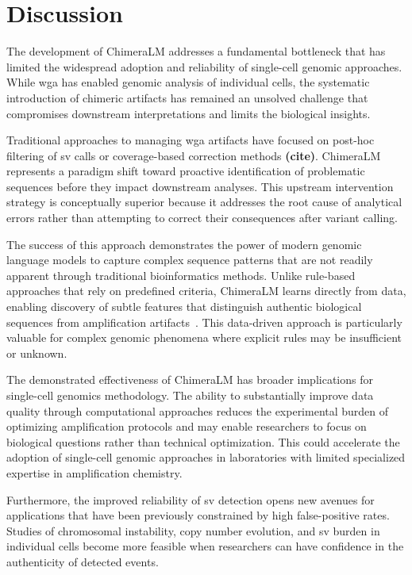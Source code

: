 \documentclass[pdflatex,sn-nature]{sn-jnl}%
\theoremstyle{thmstyleone}%
\theoremstyle{thmstyletwo}%
\theoremstyle{thmstylethree}%
\begin{document}
\section*{Discussion}

The development of ChimeraLM addresses a fundamental bottleneck that has limited the widespread adoption and reliability of single-cell genomic approaches.
While \gls{wga} has enabled genomic analysis of individual cells, the systematic introduction of chimeric artifacts has remained an unsolved challenge that compromises downstream interpretations and limits the biological insights.

Traditional approaches to managing \gls{wga} artifacts have focused on post-hoc filtering of \gls{sv} calls or coverage-based correction methods \textbf{(cite)}.
ChimeraLM represents a paradigm shift toward proactive identification of problematic sequences before they impact downstream analyses.
This upstream intervention strategy is conceptually superior because it addresses the root cause of analytical errors rather than attempting to correct their consequences after variant calling.

The success of this approach demonstrates the power of modern genomic language models to capture complex sequence patterns that are not readily apparent through traditional bioinformatics methods.
Unlike rule-based approaches that rely on predefined criteria, ChimeraLM learns directly from data, enabling discovery of subtle features that distinguish authentic biological sequences from amplification artifacts~\cite{lu2023exploration, agyabeng2025evaluating, nguyen2023hyenadna}.
This data-driven approach is particularly valuable for complex genomic phenomena where explicit rules may be insufficient or unknown.

The demonstrated effectiveness of ChimeraLM has broader implications for single-cell genomics methodology.
The ability to substantially improve data quality through computational approaches reduces the experimental burden of optimizing amplification protocols and may enable researchers to focus on biological questions rather than technical optimization.
This could accelerate the adoption of single-cell genomic approaches in laboratories with limited specialized expertise in amplification chemistry.

Furthermore, the improved reliability of \gls{sv} detection opens new avenues for applications that have been previously constrained by high false-positive rates.
Studies of chromosomal instability, copy number evolution, and \gls{sv} burden in individual cells become more feasible when researchers can have confidence in the authenticity of detected events.
\end{document}
